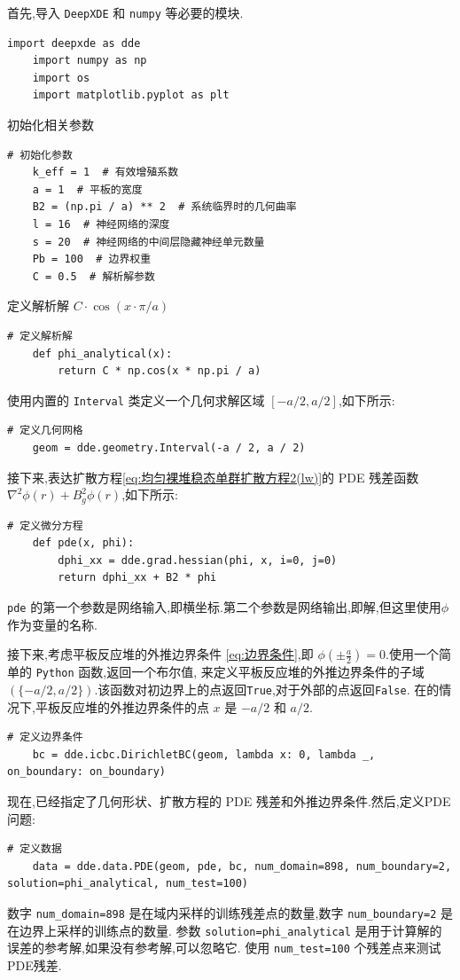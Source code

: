 \documentclass{Sichuan Normal University}
\begin{document}
\noindent
首先,导入 \texttt{DeepXDE} 和 \texttt{numpy} 等必要的模块.
\begin{lstlisting}[style=python,basicstyle=\footnotesize\fontspec{Courier New},]  
    import deepxde as dde
    import numpy as np
    import os
    import matplotlib.pyplot as plt
\end{lstlisting}
初始化相关参数
\begin{lstlisting}[style=python,basicstyle=\footnotesize\fontspec{Courier New},]  
    # 初始化参数
    k_eff = 1  # 有效增殖系数
    a = 1  # 平板的宽度
    B2 = (np.pi / a) ** 2  # 系统临界时的几何曲率
    l = 16  # 神经网络的深度
    s = 20  # 神经网络的中间层隐藏神经单元数量
    Pb = 100  # 边界权重
    C = 0.5  # 解析解参数
\end{lstlisting}
定义解析解 $C\cdot\cos(x\cdot\pi/a)$
\begin{lstlisting}[style=python,basicstyle=\footnotesize\fontspec{Courier New},]  
    # 定义解析解
    def phi_analytical(x):
        return C * np.cos(x * np.pi / a)    
\end{lstlisting}
使用内置的 \texttt{Interval} 类定义一个几何求解区域 $[-a/2,a/2]$,如下所示:
\begin{lstlisting}[style=python,basicstyle=\footnotesize\fontspec{Courier New},]  
    # 定义几何网格
    geom = dde.geometry.Interval(-a / 2, a / 2)    
\end{lstlisting}
接下来,表达扩散方程\eqref{eq:均匀裸堆稳态单群扩散方程2(lw)}的 PDE 残差函数$\nabla^2 \phi(r)+B_g^2 \phi(r)$,如下所示:

\begin{lstlisting}[style=python,basicstyle=\footnotesize\fontspec{Courier New},]  
    # 定义微分方程
    def pde(x, phi):
        dphi_xx = dde.grad.hessian(phi, x, i=0, j=0)
        return dphi_xx + B2 * phi
\end{lstlisting}
\texttt{pde} 的第一个参数是网络输入,即横坐标.第二个参数是网络输出,即解,但这里使用$\phi$作为变量的名称.

接下来,考虑平板反应堆的外推边界条件 \eqref{eq:边界条件},即 $\phi(\pm\frac{a}{2})=0$.使用一个简单的 \texttt{Python} 函数,返回一个布尔值,
来定义平板反应堆的外推边界条件的子域$(\{-a/2,a/2\})$.该函数对初边界上的点返回\texttt{True},对于外部的点返回\texttt{False}.
在的情况下,平板反应堆的外推边界条件的点 $x$ 是 $-a/2$ 和 $a/2$.
\begin{lstlisting}[style=python,basicstyle=\footnotesize\fontspec{Courier New},]  
    # 定义边界条件
    bc = dde.icbc.DirichletBC(geom, lambda x: 0, lambda _, on_boundary: on_boundary)
\end{lstlisting}
现在,已经指定了几何形状、扩散方程的 PDE 残差和外推边界条件.然后,定义PDE问题:
\begin{lstlisting}[style=python,basicstyle=\footnotesize\fontspec{Courier New},]  
    # 定义数据
    data = dde.data.PDE(geom, pde, bc, num_domain=898, num_boundary=2, solution=phi_analytical, num_test=100)
\end{lstlisting}
数字 \texttt{num\_domain=898} 是在域内采样的训练残差点的数量,数字 \texttt{num\_boundary=2} 是在边界上采样的训练点的数量.
参数 \texttt{solution=phi\_analytical} 是用于计算解的误差的参考解,如果没有参考解,可以忽略它.
使用 \texttt{num\_test=100} 个残差点来测试PDE残差.
\end{document}

